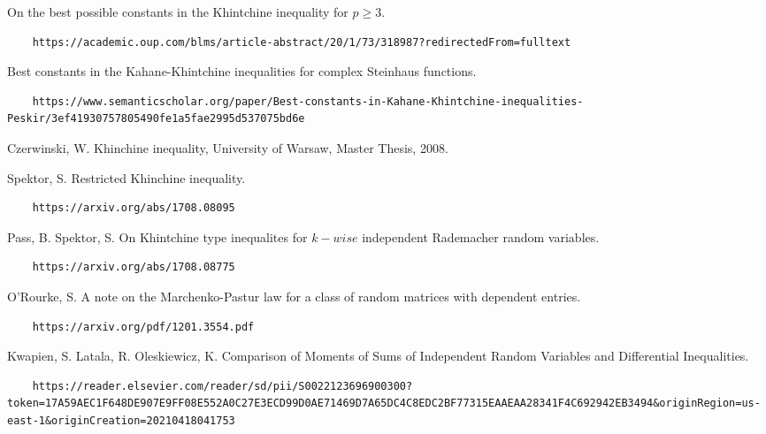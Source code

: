\documentclass[10pt]{article}
\newcommand{\1}{\textbf{1}}
\theoremstyle{remark}
\theoremstyle{definition}
\begin{document}
\begin{thebibliography}{9}
 On the best possible constants in the Khintchine inequality for $p \geq 3$. 

\begin{verbatim}
	https://academic.oup.com/blms/article-abstract/20/1/73/318987?redirectedFrom=fulltext
\end{verbatim}

 Best constants in the Kahane-Khintchine inequalities for complex Steinhaus functions. 

\begin{verbatim}
	https://www.semanticscholar.org/paper/Best-constants-in-Kahane-Khintchine-inequalities-Peskir/3ef41930757805490fe1a5fae2995d537075bd6e
\end{verbatim}

 Czerwinski, W. Khinchine inequality, University of Warsaw, Master Thesis, 2008.

 Spektor, S. Restricted Khinchine inequality. 

\begin{verbatim}
	https://arxiv.org/abs/1708.08095
\end{verbatim}

 Pass, B. Spektor, S. On Khintchine type inequalites for $k-wise$ independent Rademacher random variables. 

\begin{verbatim}
	https://arxiv.org/abs/1708.08775
\end{verbatim}

 O'Rourke, S. A note on the Marchenko-Pastur law for  a class of random matrices with dependent entries. 

\begin{verbatim}
	https://arxiv.org/pdf/1201.3554.pdf
\end{verbatim}

 Kwapien, S. Latala, R. Oleskiewicz, K. Comparison of Moments of Sums of Independent Random Variables and Differential Inequalities.

\begin{verbatim}
	https://reader.elsevier.com/reader/sd/pii/S0022123696900300?token=17A59AEC1F648DE907E9FF08E552A0C27E3ECD99D0AE71469D7A65DC4C8EDC2BF77315EAAEAA28341F4C692942EB3494&originRegion=us-east-1&originCreation=20210418041753
\end{verbatim}

\end{thebibliography}
\end{document}
